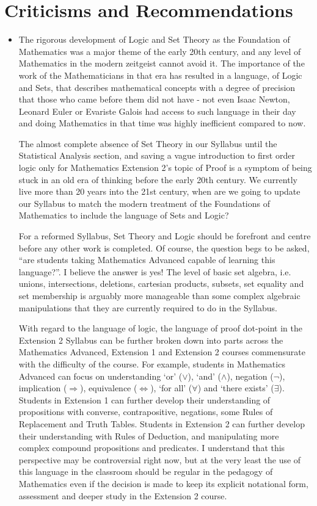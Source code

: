 \documentclass[11pt, a4paper, oneside]{article}
\begin{document}
\section{Criticisms and Recommendations}
\begin{itemize}
  \item The rigorous development of Logic and Set Theory as the Foundation of Mathematics was a major theme of the early 20th century, and any level of Mathematics in the modern zeitgeist cannot avoid it. The importance of the work of the Mathematicians in that era has resulted in a language, of Logic and Sets, that describes mathematical concepts with a degree of precision that those who came before them did not have - not even Isaac Newton, Leonard Euler or Evariste Galois had access to such language in their day and doing Mathematics in that time was highly inefficient compared to now.

    The almost complete absence of Set Theory in our Syllabus until the Statistical Analysis section, and saving a vague introduction to first order logic only for Mathematics Extension 2's topic of Proof is a symptom of being stuck in an old era of thinking before the early 20th century. We currently live more than 20 years into the 21st century, when are we going to update our Syllabus to match the modern treatment of the Foundations of Mathematics to include the language of Sets and Logic?

    For a reformed Syllabus, Set Theory and Logic should be forefront and centre before any other work is completed. Of course, the question begs to be asked, ``are students taking Mathematics Advanced capable of learning this language?''. I believe the answer is yes! The level of basic set algebra, i.e. unions, intersections, deletions, cartesian products, subsets, set equality and set membership is arguably more manageable than some complex algebraic manipulations that they are currently required to do in the Syllabus.

    With regard to the language of logic, the language of proof dot-point in the Extension 2 Syllabus can be further broken down into parts across the Mathematics Advanced, Extension 1 and Extension 2 courses commensurate with the difficulty of the course. For example, students in Mathematics Advanced can focus on understanding `or' ($\lor$), `and' ($\land$), negation ($\neg$), implication ($\Rightarrow$), equivalence ($\Leftrightarrow$), `for all' ($\forall$) and `there exists' ($\exists$). Students in Extension 1 can further develop their understanding of propositions with converse, contrapositive, negations, some Rules of Replacement and Truth Tables. Students in Extension 2 can further develop their understanding with Rules of Deduction, and manipulating more complex compound propositions and predicates. I understand that this perspective may be controversial right now, but at the very least the use of this language in the classroom should be regular in the pedagogy of Mathematics even if the decision is made to keep its explicit notational form, assessment and deeper study in the Extension 2 course.


\end{itemize}
\end{document}
